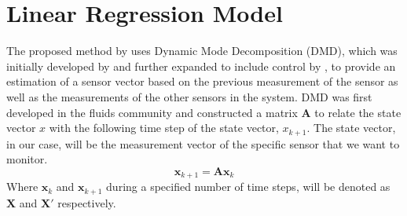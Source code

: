 %
%
%

\section{Linear Regression Model}
The proposed method by \cite{DeSilva2020} uses Dynamic Mode Decomposition (DMD), which was initially developed by \cite{schmid2011applications} and further expanded to include control by \cite{proctor2016dynamic}, to provide an estimation of a sensor vector based on the previous measurement of the sensor as well as the measurements of the other sensors in the system. DMD was first developed in the fluids community and constructed a matrix $\mathbf{A}$ to relate the state vector $x$ with the following time step of the state vector, $x_{k+1}$. The state vector, in our case, will be the measurement vector of the specific sensor that we want to monitor.
\begin{equation}
	\mathbf{x}_{k+1} = \mathbf{Ax}_k
\end{equation}
Where $\mathbf{x}_k$ and $\mathbf{x}_{k+1}$ during a specified number of time steps, will be denoted as $\mathbf{X}$ and $\mathbf{X'}$ respectively.

